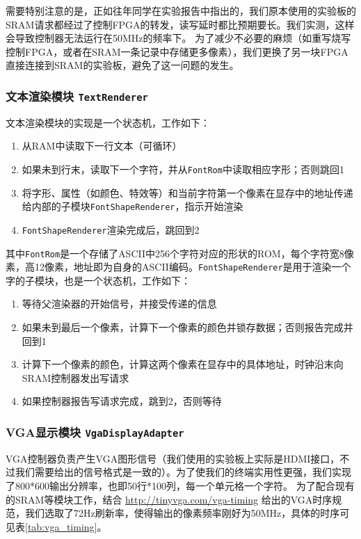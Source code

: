 需要特别注意的是，正如往年同学在实验报告中指出的，我们原本使用的实验板的SRAM请求都经过了控制FPGA的转发，读写延时都比预期要长。我们实测，这样会导致控制器无法运行在50MHz的频率下。
为了减少不必要的麻烦（如重写烧写控制FPGA，或者在SRAM一条记录中存储更多像素），我们更换了另一块FPGA直接连接到SRAM的实验板，避免了这一问题的发生。

\subsubsection{文本渲染模块 \texttt{TextRenderer}}
文本渲染模块的实现是一个状态机，工作如下：
\begin{enumerate}
  \item 从RAM中读取下一行文本（可循环）
  \item 如果未到行末，读取下一个字符，并从\texttt{FontRom}中读取相应字形；否则跳回1
  \item 将字形、属性（如颜色、特效等）和当前字符第一个像素在显存中的地址传递给内部的子模块\texttt{FontShapeRenderer}，指示开始渲染
  \item \texttt{FontShapeRenderer}渲染完成后，跳回到2
\end{enumerate}

其中\texttt{FontRom}是一个存储了ASCII中256个字符对应的形状的ROM，每个字符宽8像素，高12像素，地址即为自身的ASCII编码。\texttt{FontShapeRenderer}是用于渲染一个字的子模块，也是一个状态机，工作如下：
\begin{enumerate}
  \item 等待父渲染器的开始信号，并接受传递的信息
  \item 如果未到最后一个像素，计算下一个像素的颜色并锁存数据；否则报告完成并回到1
  \item 计算下一个像素的颜色，计算这两个像素在显存中的具体地址，时钟沿末向SRAM控制器发出写请求
  \item 如果控制器报告写请求完成，跳到2，否则等待
\end{enumerate}


\subsubsection{VGA显示模块 \texttt{VgaDisplayAdapter}}
VGA控制器负责产生VGA图形信号（我们使用的实验板上实际是HDMI接口，不过我们需要给出的信号格式是一致的）。为了使我们的终端实用性更强，我们实现了800*600输出分辨率，也即50行*100列，每一个单元格一个字符。
为了配合现有的SRAM等模块工作，结合 \url{http://tinyvga.com/vga-timing} 给出的VGA时序规范，我们选取了72Hz刷新率，使得输出的像素频率刚好为50MHz，具体的时序可见表\ref{tab:vga_timing}。

